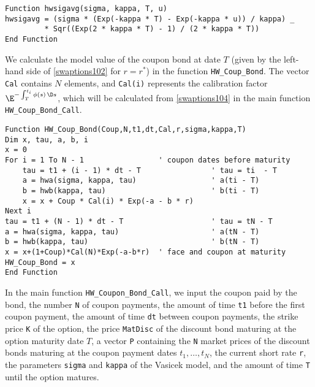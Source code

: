 \small\begin{verbatim}
Function hwsigavg(sigma, kappa, T, u)
hwsigavg = (sigma * (Exp(-kappa * T) - Exp(-kappa * u)) / kappa) _
         * Sqr((Exp(2 * kappa * T) - 1) / (2 * kappa * T))
End Function
\end{verbatim}\normalsize
We calculate the model value of the coupon bond at date $T$ (given by the left-hand side of  \eqref{swaptions102} for $r=r^*$) in the function \verb!HW_Coup_Bond!.  The vector \verb!Cal! contains $N$ elements, and \verb!Cal(i)! represents the calibration factor $\E^{-\int_T^{t_i} \phi(s)\,\D s}$, which will be calculated from  \eqref{swaptions104} in the main function  \verb!HW_Coup_Bond_Call!.

\small\begin{verbatim}
Function HW_Coup_Bond(Coup,N,t1,dt,Cal,r,sigma,kappa,T)
Dim x, tau, a, b, i
x = 0
For i = 1 To N - 1                 ' coupon dates before maturity
    tau = t1 + (i - 1) * dt - T                ' tau = ti  - T
    a = hwa(sigma, kappa, tau)                 ' a(ti - T)
    b = hwb(kappa, tau)                        ' b(ti - T)
    x = x + Coup * Cal(i) * Exp(-a - b * r)
Next i
tau = t1 + (N - 1) * dt - T                    ' tau = tN - T
a = hwa(sigma, kappa, tau)                     ' a(tN - T)
b = hwb(kappa, tau)                            ' b(tN - T)
x = x+(1+Coup)*Cal(N)*Exp(-a-b*r)  ' face and coupon at maturity
HW_Coup_Bond = x
End Function
\end{verbatim}\normalsize
In the main function  \verb!HW_Coupon_Bond_Call!, we input the coupon  paid by the bond, the number \verb!N! of coupon payments, the amount of time \verb!t1! before the first coupon payment, the amount of time \verb!dt! between coupon payments, the strike price \verb!K! of the option, the price \verb!MatDisc! of the discount bond maturing at the option maturity date $T$, a vector \verb!P! containing the \verb!N! market prices of the discount bonds maturing at the coupon payment dates $t_1, \ldots, t_N$, the current short rate \verb!r!, the parameters \verb!sigma! and \verb!kappa! of the Vasicek model, and the amount of time \verb!T! until the option matures.

